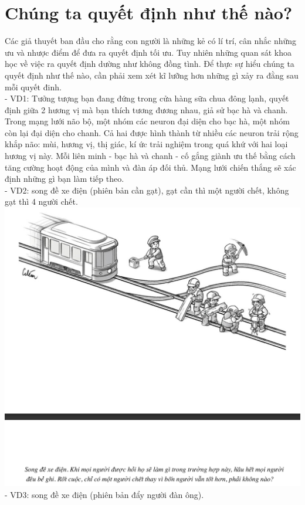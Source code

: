 \documentclass{article}
\newcommand\tab[1][1cm]{\hspace*{#1}}
\begin{document}
\section{Chúng ta quyết định như thế nào?}
\tab Các giả thuyết ban đầu cho rằng con người là những kẻ có lí trí, cân nhắc những ưu và nhược điểm để đưa ra
quyết định tối ưu. Tuy nhiên những quan sát khoa học về việc ra quyết định dường như không đồng tình. 
Để thực sự hiểu chúng ta quyết định như thế nào, cần phải xem xét kĩ lưỡng hơn những gì xảy ra đằng sau 
mỗi quyết đinh. \\
\tab - VD1: Tưởng tượng bạn đang đứng trong cửa hàng sữa chua đông lạnh, quyết định giữa 2 hương vị mà bạn
thích tương đương nhau, giả sử bạc hà và chanh. Trong mạng lưới não bộ, một nhóm các neuron đại diện cho bạc
hà, một nhóm còn lại đại diện cho chanh. Cả hai được hình thành từ nhiều các neuron trải rộng khắp não: mùi, 
hương vị, thị giác, kí ức trải nghiệm trong quá khứ với hai loại hương vị này. Mỗi liên minh - bạc hà và chanh -
cố gắng giành ưu thế bằng cách tăng cường hoạt động của mình và đàn áp đối thủ. Mạng lưới chiến thắng sẽ xác 
định những gì bạn làm tiếp theo.\\
\tab - VD2: song đề xe điện (phiên bản cần gạt), gạt cần thì một người chết, không gạt thì 4 người chết.\\
\includegraphics[width=\textwidth]{images/songdexedienver1.png}
\tab - VD3: song đề xe điện (phiên bản đẩy người đàn ông).\\
\end{document}
